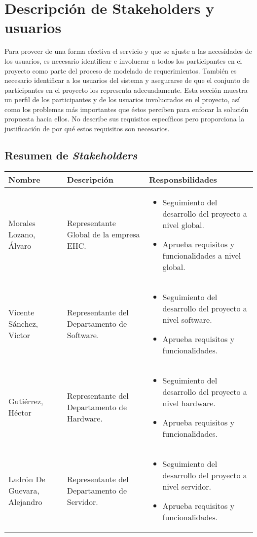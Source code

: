 \chapter{Descripción de Stakeholders y usuarios}
    Para proveer de una forma efectiva el servicio y que se ajuste a las necesidades de los usuarios, es necesario identificar e involucrar a todos los participantes en el proyecto como parte del proceso de modelado de requerimientos. También es necesario identificar a los usuarios del sistema y asegurarse de que el conjunto de participantes en el proyecto los representa adecuadamente. Esta sección muestra un perfil de los participantes y de los usuarios involucrados en el proyecto, así como los problemas más importantes que éstos perciben para enfocar la solución propuesta hacia ellos. No describe sus requisitos específicos pero proporciona la justificación de por qué estos requisitos son necesarios.

\section{Resumen de \textit{Stakeholders}}
    \begin{tabular}{|p{4cm}|p{3cm}|p{10cm}|}
        \hline \textbf{Nombre} &  \textbf{Descripción} & \textbf{Responsbilidades} \\
        \hline Morales Lozano, Álvaro & Representante Global de la empresa EHC. &
        \begin{itemize}
            \item Seguimiento del desarrollo del proyecto a nivel global.
            \item Aprueba requisitos y funcionalidades a nivel global.
        \end{itemize} \\
        \hline Vicente Sánchez, Victor & Representante del Departamento de Software. &
        \begin{itemize}
            \item Seguimiento del desarrollo del proyecto a nivel software.
            \item Aprueba requisitos y funcionalidades.
        \end{itemize} \\
        \hline Gutiérrez, Héctor & Representante del Departamento de Hardware. &
        \begin{itemize}
            \item Seguimiento del desarrollo del proyecto a nivel hardware.
            \item Aprueba requisitos y funcionalidades.
        \end{itemize} \\
        \hline Ladrón De Guevara, Alejandro & Representante del Departamento de Servidor.&
        \begin{itemize}
            \item Seguimiento del desarrollo del proyecto a nivel servidor.
            \item Aprueba requisitos y funcionalidades.
        \end{itemize} \\
        \hline
    \end{tabular}

